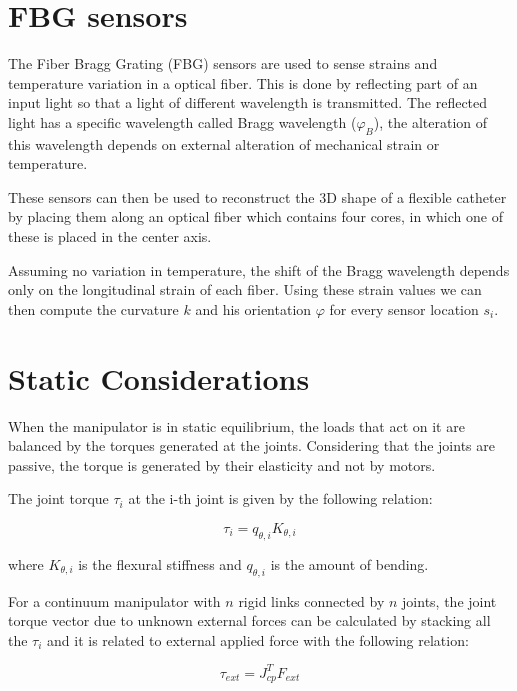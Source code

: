 \documentclass[conference,12pt]{IEEEtran}
\begin{document}
\section{FBG sensors}

The Fiber Bragg Grating (FBG) sensors are used to sense strains and temperature variation in a optical fiber. This is done by reflecting part of an input light so that a light of different wavelength is transmitted. The reflected light has a specific wavelength called Bragg wavelength ($\varphi_B$), the alteration of this wavelength depends on external alteration of mechanical strain or temperature.

These sensors can then be used to reconstruct the 3D shape of a flexible catheter by placing them along an optical fiber which contains four cores, in which one of these is placed in the center axis.

Assuming no variation in temperature, the shift of the Bragg wavelength depends only on the longitudinal strain of each fiber. 
Using these strain values we can then compute the curvature $k$ and his orientation $\varphi$ for every sensor location $s_i$. 

\section{Static Considerations}

When the manipulator is in static equilibrium, the loads that act on it are balanced by the torques generated at the joints. Considering that the joints are passive, the torque is generated by their elasticity and not by motors.

The joint torque $\tau_i$ at the i-th joint is given by the following relation:

\begin{equation}
\label{eq:1}
\tau_i = q_{\theta,i}K_{\theta,i}
\end{equation}

where $K_{\theta,i}$ is the flexural stiffness and $q_{\theta,i}$ is the amount of bending.

For a continuum manipulator with $n$ rigid links connected by $n$ joints, the joint torque vector due to unknown external forces can be calculated by stacking all the $\tau_i$ and it is related to external applied force with the following relation:

\begin{equation}
\label{eq:2}
\tau_{ext} = J_{cp}^TF_{ext}
\end{equation}
\end{document}

